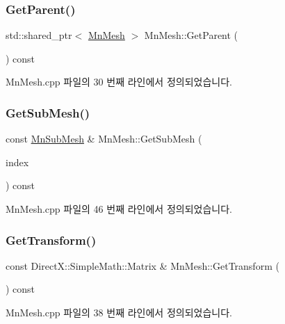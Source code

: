 \subsubsection{\texorpdfstring{Get\+Parent()}{GetParent()}}
{\footnotesize\ttfamily std\+::shared\+\_\+ptr$<$ \hyperlink{class_m_n_l_1_1_mn_mesh}{Mn\+Mesh} $>$ Mn\+Mesh\+::\+Get\+Parent (\begin{DoxyParamCaption}{ }\end{DoxyParamCaption}) const}



Mn\+Mesh.\+cpp 파일의 30 번째 라인에서 정의되었습니다.

\mbox{\label{class_m_n_l_1_1_mn_mesh_ab765c79f606507de6d1be69f51ec2502}} 
\subsubsection{\texorpdfstring{Get\+Sub\+Mesh()}{GetSubMesh()}}
{\footnotesize\ttfamily const \hyperlink{struct_m_n_l_1_1_mn_sub_mesh}{Mn\+Sub\+Mesh} \& Mn\+Mesh\+::\+Get\+Sub\+Mesh (\begin{DoxyParamCaption}\item[{U\+I\+NT}]{index }\end{DoxyParamCaption}) const}



Mn\+Mesh.\+cpp 파일의 46 번째 라인에서 정의되었습니다.

\mbox{\label{class_m_n_l_1_1_mn_mesh_a6e1178196c41f872f432a65a02a786e5}} 
\subsubsection{\texorpdfstring{Get\+Transform()}{GetTransform()}}
{\footnotesize\ttfamily const Direct\+X\+::\+Simple\+Math\+::\+Matrix \& Mn\+Mesh\+::\+Get\+Transform (\begin{DoxyParamCaption}{ }\end{DoxyParamCaption}) const}



Mn\+Mesh.\+cpp 파일의 38 번째 라인에서 정의되었습니다.

